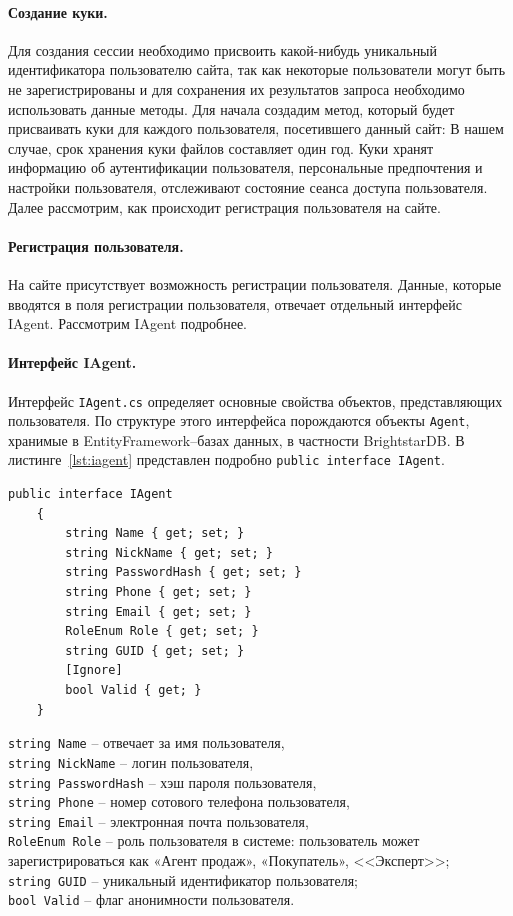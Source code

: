\documentclass[a4paper,14pt,openany,final]{extreport} %
\def\oldcaption{} \let\oldcaption=\caption
\def\caption{\stepcounter{captionsnum}\oldcaption}
\begin{document}
{\paragraph{Создание куки.}
Для создания сессии необходимо присвоить какой-нибудь уникальный идентификатора пользователю сайта, так как некоторые пользователи могут быть не зарегистрированы и для сохранения их результатов запроса необходимо использовать данные методы.
Для начала создадим метод, который будет присваивать куки для каждого пользователя, посетившего данный сайт:
В нашем случае, срок хранения куки файлов составляет один год. Куки хранят информацию об аутентификации пользователя, персональные предпочтения и настройки пользователя, отслеживают состояние сеанса доступа пользователя. Далее рассмотрим, как происходит регистрация пользователя на сайте.

\paragraph{Регистрация пользователя.}
На сайте присутствует возможность регистрации пользователя. Данные, которые вводятся в поля регистрации пользователя, отвечает отдельный интерфейс IAgent. Рассмотрим IAgent подробнее.

\paragraph{Интерфейс IAgent.}
Интерфейс \verb|IAgent.cs| определяет основные свойства объектов, представляющих пользователя. По структуре этого интерфейса порождаются объекты \verb|Agent|, хранимые в EntityFramework\;--\;базах данных, в частности BrightstarDB. В листинге~\ref{lst:iagent} представлен подробно \verb|public interface IAgent|.
\begin{pzlisting}
\caption{Интерфейс регистрации пользователя}\label{lst:iagent}
\begin{verbatim}
public interface IAgent
    {
        string Name { get; set; }
        string NickName { get; set; }
        string PasswordHash { get; set; }
        string Phone { get; set; }
        string Email { get; set; }
        RoleEnum Role { get; set; }
        string GUID { get; set; }
        [Ignore]
        bool Valid { get; }
    }
\end{verbatim}
\end{pzlisting}

\noindent\verb|string Name| – отвечает за имя пользователя,\\
\verb|string NickName| – логин пользователя,\\
\verb|string PasswordHash| – хэш пароля пользователя,\\
\verb|string Phone| – номер сотового телефона пользователя,\\
\verb|string Email| – электронная почта пользователя,\\
\verb|RoleEnum Role| – роль пользователя в системе: пользователь может зарегистрироваться как «Агент продаж», «Покупатель», <<Эксперт>>;\\
\verb|string GUID| – уникальный идентификатор пользователя;\\
\verb|bool Valid| – флаг анонимности пользователя.

}
\end{document}
